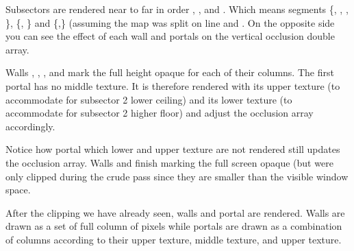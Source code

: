 Subsectors are rendered near to far in order , , and . Which means segments \{, , , \}, \{, \} and \{,\} (assuming the map was split on line  and . On the opposite side you can see the effect of each wall and portals on the vertical occlusion double array.\\
\par
Walls , , , and  mark the full height opaque for each of their columns. The first portal  has no middle texture. It is therefore rendered with its upper texture (to accommodate for subsector 2 lower ceiling) and its lower texture (to accommodate for subsector 2 higher floor) and adjust the occlusion array accordingly.\\
\par
Notice how portal  which lower and upper texture are not rendered still updates the occlusion array. Walls  and  finish marking the full screen opaque (but were only clipped during the crude pass since they are smaller than the visible window space.\\


\par
 















After the clipping we have already seen, walls and portal are rendered. Walls are drawn as a set of full column of pixels while portals are drawn as a combination of columns according to their upper texture, middle texture, and upper texture.\\
\par
{}\\
\par

